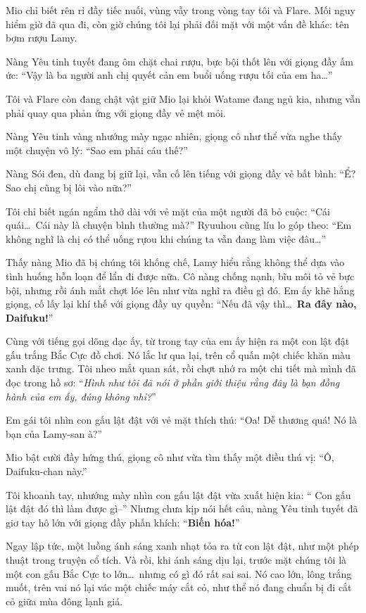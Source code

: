 \documentclass[../main.tex]{subfiles}
\begin{document}
Mio chỉ biết rên rỉ đầy tiếc nuối, vùng vẫy trong vòng tay tôi và Flare. Mối nguy hiểm giờ đã qua đi, còn giờ chúng tôi lại phải đối mặt với một vấn đề khác: tên bợm rượu Lamy.

Nàng Yêu tinh tuyết đang ôm chặt chai rượu, bực bội thốt lên với giọng đầy ấm ức: ``Vậy là ba người anh chị quyết cản em buổi uống rượu tối của em ha\dots''

Tôi và Flare còn đang chật vật giữ Mio lại khỏi Watame đang ngủ kia, nhưng vẫn phải quay qua phản ứng với giọng đầy vẻ mệt mỏi.


Nàng Yêu tinh vàng nhướng mày ngạc nhiên, giọng cô như thể vừa nghe thấy một chuyện vô lý: ``Sao em phải cáu thế?''

Nàng Sói đen, dù đang bị giữ lại, vẫn cố lên tiếng với giọng đầy vẻ bất bình: ``Ể? Sao chị cũng bị lôi vào nữa?''

Tôi chỉ biết ngán ngẩm thở dài với vẻ mặt của một người đã bỏ cuộc: ``Cái quái\dots\ Cái này là chuyện bình thường mà?'' Ryuuhou cũng líu lo góp theo: ``Em không nghĩ là chị có thể uống rựou khi chúng ta vẫn đang làm việc đâu\dots''

Thấy nàng Mio đã bị chúng tôi khống chế, Lamy hiểu rằng không thể dựa vào tình huống hỗn loạn để lẩn đi được nữa. Cô nàng chống nạnh, bĩu môi tỏ vẻ bực bội, nhưng rồi ánh mắt chợt lóe lên như vừa nghĩ ra điều gì đó. Em ấy khẽ hắng giọng, cố lấy lại khí thế với giọng đầy uy quyền: ``Nếu đã vậy thì\dots\ \textbf{Ra đây nào, Daifuku!}''


Cùng với tiếng gọi dõng dạc ấy, từ trong tay của em ấy hiện ra một con lật đật gấu trắng Bắc Cực đồ chơi. Nó lắc lư qua lại, trên cổ quấn một chiếc khăn màu xanh đặc trưng. Tôi nheo mắt quan sát, rồi chợt nhớ ra một chi tiết mà mình đã đọc trong hồ sơ: ``\textit{Hình như tôi đã nói ở phần giới thiệu rằng đây là bạn đồng hành của em ấy, đúng không nhỉ?}''

Em gái tôi nhìn con gấu lật đật với vẻ mặt thích thú: ``Oa! Dễ thương quá! Nó là bạn của Lamy-san à?''

Mio bật cười đầy hứng thú, giọng cô như vừa tìm thấy một điều thú vị: ``Ô, Daifuku-chan này.''

Tôi khoanh tay, nhướng mày nhìn con gấu lật đật vừa xuất hiện kia: `` Con gấu lật đật đó thì làm được gì--''  Nhưng chưa kịp nói hết câu, nàng Yêu tinh tuyết đã giơ tay hô lớn với giọng đầy phấn khích: ``\textbf{Biến hóa!}''

Ngay lập tức, một luồng ánh sáng xanh nhạt tỏa ra từ con lật đật, như một phép thuật trong truyện cổ tích. Và rồi, khi ánh sáng dịu lại, trước mặt chúng tôi là một con gấu Bắc Cực to lớn\dots\ nhưng có gì đó rất sai sai. Nó cao lớn, lông trắng muốt, trên vai nó lại vác một chiếc máy cắt cỏ, như thể nó đang chuẩn bị đi cắt cỏ giữa mùa đông lạnh giá.
\end{document}
